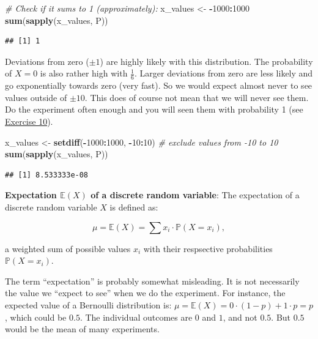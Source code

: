 \documentclass[
]{book}
\newenvironment{Shaded}{\begin{snugshade}}{\end{snugshade}}
\newcommand{\CommentTok}[1]{\textcolor[rgb]{0.56,0.35,0.01}{\textit{#1}}}
\newcommand{\DecValTok}[1]{\textcolor[rgb]{0.00,0.00,0.81}{#1}}
\newcommand{\FunctionTok}[1]{\textcolor[rgb]{0.13,0.29,0.53}{\textbf{#1}}}
\newcommand{\NormalTok}[1]{#1}
\newcommand{\OtherTok}[1]{\textcolor[rgb]{0.56,0.35,0.01}{#1}}
\newcommand{\SpecialCharTok}[1]{\textcolor[rgb]{0.81,0.36,0.00}{\textbf{#1}}}
\begin{document}
\begin{Shaded}
\begin{Highlighting}[]
\CommentTok{\# Check if it sums to 1 (approximately):}
\NormalTok{x\_values }\OtherTok{\textless{}{-}} \SpecialCharTok{{-}}\DecValTok{1000}\SpecialCharTok{:}\DecValTok{1000}
\FunctionTok{sum}\NormalTok{(}\FunctionTok{sapply}\NormalTok{(x\_values, P))}
\end{Highlighting}
\end{Shaded}

\begin{verbatim}
## [1] 1
\end{verbatim}

Deviations from zero (\(\pm 1\)) are highly likely with this distribution. The probability of \(X=0\) is also rather high with \(\frac{1}{6}\).
Larger deviations from zero are less likely and go exponentially towards zero (very fast). So we would expect almost never to see values outside
of \(\pm 10\). This does of course not mean that we will never see them. Do the experiment often enough and you will seen them with
probability 1 (see \hyperref[exercise10]{Exercise 10}).

\begin{Shaded}
\begin{Highlighting}[]
\NormalTok{x\_values }\OtherTok{\textless{}{-}} \FunctionTok{setdiff}\NormalTok{(}\SpecialCharTok{{-}}\DecValTok{1000}\SpecialCharTok{:}\DecValTok{1000}\NormalTok{, }\SpecialCharTok{{-}}\DecValTok{10}\SpecialCharTok{:}\DecValTok{10}\NormalTok{) }\CommentTok{\# exclude values from {-}10 to 10}
\FunctionTok{sum}\NormalTok{(}\FunctionTok{sapply}\NormalTok{(x\_values, P))}
\end{Highlighting}
\end{Shaded}

\begin{verbatim}
## [1] 8.533333e-08
\end{verbatim}

\textbf{Expectation \(\mathbb{E}(X)\) of a discrete random variable}: The expectation of a discrete random variable \(X\) is defined as:

\[\mu = \mathbb{E}(X) = \sum x_i \cdot \mathbb{P}(X = x_i),\]

a weighted sum of possible values \(x_i\) with their respsective probabilities \(\mathbb{P}(X = x_i)\).

The term ``expectation'' is probably somewhat misleading. It is not necessarily the value we ``expect to see'' when we do the experiment. For instance,
the expected value of a Bernoulli distribution is: \(\mu = \mathbb{E}(X) = 0 \cdot (1-p) + 1 \cdot p = p\), which could be \(0.5\). The individual outcomes are \(0\) and \(1\),
and not \(0.5\). But \(0.5\) would be the mean of many experiments.
\end{document}
